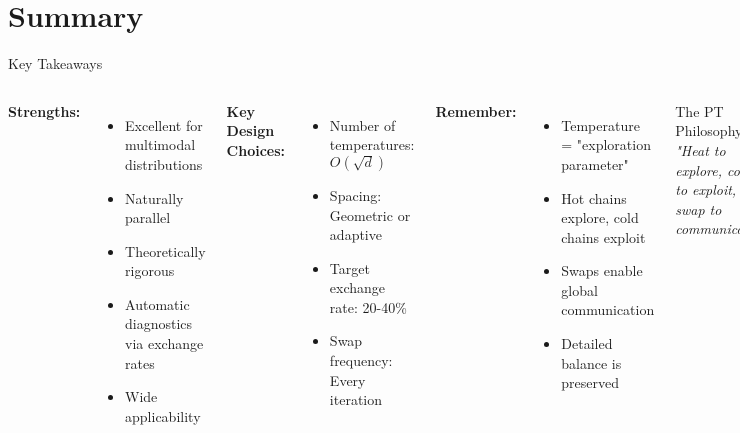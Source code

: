 \documentclass[aspectratio=169]{beamer}
\begin{document}
\section{Summary}

\begin{frame}{Key Takeaways}
	\begin{columns}
		\textbf{Strengths:}
		\begin{itemize}
			\item Excellent for multimodal distributions %
			\item Naturally parallel %
			\item Theoretically rigorous %
			\item Automatic diagnostics via exchange rates %
			\item Wide applicability %
		\end{itemize}

		\vspace{0.5cm}
		\textbf{Key Design Choices:}
		\begin{itemize}
			\item Number of temperatures: $O(\sqrt{d})$
			\item Spacing: Geometric or adaptive
			\item Target exchange rate: 20-40\%
			\item Swap frequency: Every iteration
		\end{itemize}

		\textbf{Remember:}
		\begin{itemize}
			\item Temperature = "exploration parameter"
			\item Hot chains explore, cold chains exploit
			\item Swaps enable global communication
			\item Detailed balance is preserved
		\end{itemize}

		\vspace{0.5cm}
		\begin{block}{The PT Philosophy}
			\textit{"Heat to explore, cool to exploit, swap to communicate"}
		\end{block}

		\vspace{0.3cm}
		\textbf{Active Research Areas:}
		\begin{itemize}
			\item Optimal temperature schedules
			\item Non-reversible variants
			\item Machine learning integration
			\item Application to deep learning
		\end{itemize}
	\end{columns}
\end{frame}
\end{document}
